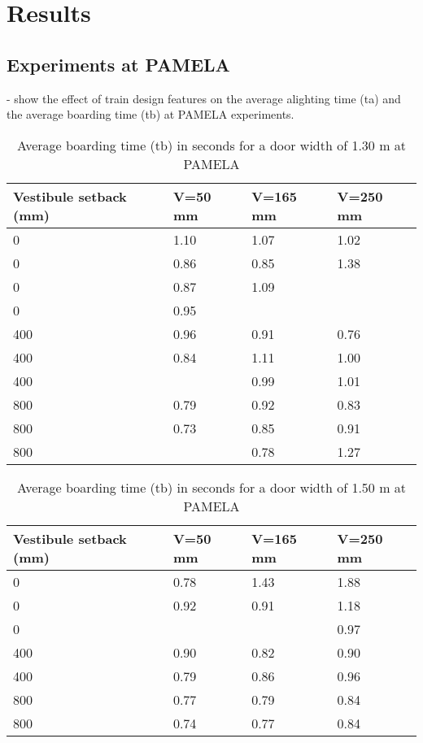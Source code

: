 
\section{Results}
\label{sec:4}

\subsection{Experiments at PAMELA}
\label{sec:4.1}

- show the effect of train design features on the average alighting time (ta) and the average boarding time (tb) at PAMELA experiments. 

\begin{table}
  \label{tab:1} %
  \centering
  \begin{tabular}{llll}
    \toprule
    Vestibule setback (mm) & V=50 mm & V=165 mm & V=250 mm \\
    \midrule
        0 & 1.10 & 1.07 & 1.02  \\
        0 & 0.86 & 0.85 & 1.38  \\
		0 & 0.87 & 1.09 &       \\
		0 & 0.95 &      &       \\
		400 & 0.96 & 0.91 & 0.76  \\
		400 & 0.84 & 1.11 & 1.00  \\
		400 &      & 0.99 & 1.01  \\
		800 & 0.79 & 0.92 & 0.83  \\
		800 & 0.73 & 0.85 & 0.91  \\
		800 &      & 0.78 & 1.27  \\
	\bottomrule
  \end{tabular}
  \caption{Average boarding time (tb) in seconds for a door width of 1.30 m at PAMELA}
  
\end{table}

\begin{table}
  \label{tab:2} %
  \centering
  \begin{tabular}{llll}
    \toprule
    Vestibule setback (mm) & V=50 mm & V=165 mm & V=250 mm \\
    \midrule
        0 & 0.78 & 1.43 & 1.88  \\
        0 & 0.92 & 0.91 & 1.18  \\
		0 &      &      & 0.97  \\
		400 & 0.90 & 0.82 & 0.90  \\
		400 & 0.79 & 0.86 & 0.96  \\
		800 & 0.77 & 0.79 & 0.84  \\
		800 & 0.74 & 0.77 & 0.84  \\
	\bottomrule
  \end{tabular}
  \caption{Average boarding time (tb) in seconds for a door width of 1.50 m at PAMELA}
  
\end{table}

